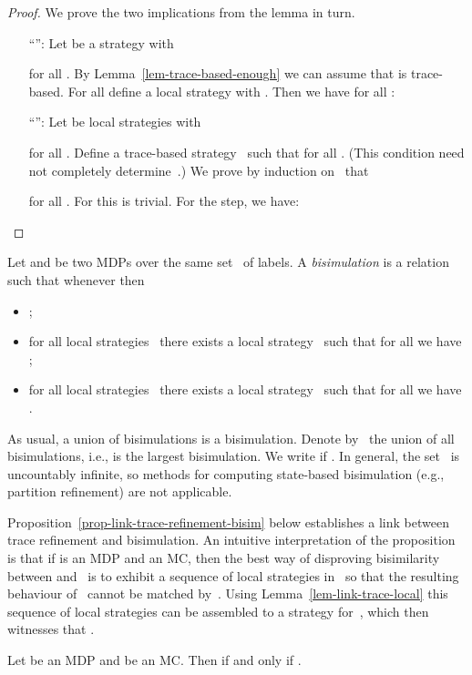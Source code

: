 \begin{proof}
We prove the two implications from the lemma in turn.
\begin{itemize}[align=left]
\item[``'':]
Let  be a strategy with

for all .
By Lemma~\ref{lem-trace-based-enough} we can assume that  is trace-based.
For all  define a local strategy  with .
Then we have for all :

\item[``'':]
Let  be local strategies with

for all .
Define a trace-based strategy~ such that
 for all .
(This condition need not completely determine~.)
We prove by induction on~ that

for all .
For  this is trivial.
For the step, we have:

\end{itemize}
\end{proof}

\noindent
Let    and  be two MDPs over
the same set~ of labels.
A \emph{bisimulation} is a relation~ such that whenever
  then
\begin{itemize}
\item ;
\item for all local strategies~ there exists a local strategy~ such that for all  we have ;
\item for all local strategies~ there exists a local strategy~ such that for all  we have .
\end{itemize}
As usual, a union of bisimulations is a bisimulation.
Denote by~ the union of all bisimulations, i.e.,  is the largest bisimulation.
We write  if .
In general, the set~ is uncountably infinite, so methods for computing state-based bisimulation (e.g., partition refinement) are not applicable.

Proposition~\ref{prop-link-trace-refinement-bisim} below establishes a link between trace refinement and bisimulation.
An intuitive interpretation of the proposition is that if  is an MDP and  an MC, then the best way of disproving bisimilarity between  and~ is to exhibit a sequence of local strategies in~ so that the resulting behaviour of~ cannot be matched by~.
Using Lemma~\ref{lem-link-trace-local} this sequence of local strategies can be assembled to a strategy for~, which then witnesses that .

\begin{prop}\label{prop-link-trace-refinement-bisim}
Let  be an MDP and  be an MC\@.
Then  if and only if .
\end{prop}

